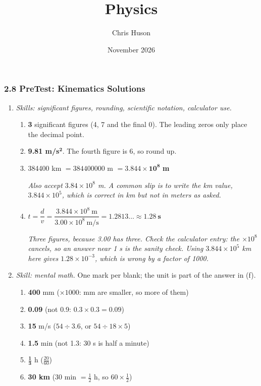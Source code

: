 \documentclass[12pt, twoside]{article}
\title{Physics}
\author{Chris Huson}
\date{November 2026}
\begin{document}
\subsubsection*{2.8 PreTest: Kinematics Solutions}

\begin{enumerate}[itemsep=0.5cm]

\item \emph{Skills: significant figures, rounding, scientific notation, calculator
  use.}
  \begin{enumerate}[itemsep=0.3cm]
    \item \textbf{3} significant figures (4, 7 and the final 0). The leading zeros
      only place the decimal point.
    \item \textbf{9.81 m/s$^\mathbf{2}$}. The fourth figure is 6, so round up.
    \item \num{384400} km $= \num{384400000}$ m $= \mathbf{3.844 \times 10^{8}}$
      \textbf{m}

      \emph{Also accept $3.84 \times 10^{8}$ m. A common slip is to write the km value,
      $3.844 \times 10^{5}$, which is correct in km but not in meters as asked.}
    \item $t = \dfrac{d}{v} = \dfrac{3.844 \times 10^{8}~\text{m}}{3.00 \times 10^{8}~\text{m/s}}
      = 1.2813\ldots \approx \mathbf{1.28~\textbf{s}}$

      \emph{Three figures, because 3.00 has three. Check the calculator entry: the
      $\times 10^{8}$ cancels, so an answer near 1 s is the sanity check. Using
      $3.844 \times 10^{5}$ km here gives $1.28 \times 10^{-3}$, which is wrong
      by a factor of 1000.}
  \end{enumerate}

\item \emph{Skill: mental math.} One mark per blank; the unit is part of the answer
  in (f).
  \begin{enumerate}[itemsep=0.1cm]
      \item \textbf{400} mm \quad ($\times 1000$: mm are smaller, so more of them)
      \item \textbf{0.09} \quad (not 0.9: $0.3 \times 0.3 = 0.09$)
      \item \textbf{15} m/s \quad ($54 \div 3.6$, or $54 \div 18 \times 5$)
      \item \textbf{1.5} min \quad (not 1.3: 30 s is half a minute)
      \item $\mathbf{\frac{1}{3}}$ h \quad ($\frac{20}{60}$)
      \item \textbf{30 km} \quad (30 min $= \frac{1}{2}$ h, so $60 \times \frac{1}{2}$)
  \end{enumerate}


\end{enumerate}
\end{document}
